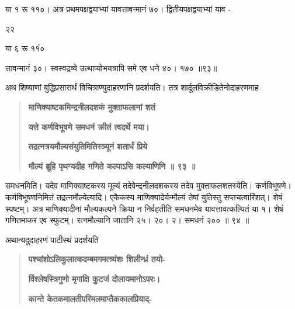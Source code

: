 \documentclass[11pt, openany]{book}
\begin{document}
\begin{sloppypar}
\hangindent=0.2in या १ रू ११०। अत्र प्रथमपक्षद्वयाभ्यां यावत्तावन्मानं ७०। द्वितीयपक्षद्वयाभ्यां याव -

\hspace{0.2in}२\hspace{0.3in}२

या ६ रू ११ं०

\hangindent=0.2in त्तावन्मानं ३०। स्वस्वद्रव्ये उत्थाप्योभयत्रापि समे एव धने ४०। १७० ॥९३॥

\hangindent=0.2in \hspace{0.2in}अथ शिष्याणां बुद्धिप्रसारार्थं विचित्राण्युदाहरणानि प्रदर्शयति। तत्र शार्दूलविक्रीडितेनोदाहरणमाह\textendash

\begin{quote}
\hspace{1in}\textbf{माणिक्याष्टकमिन्द्रनीलदशकं मुक्ताफलानां शतं}

\hspace{1in}\textbf{यत्ते कर्णविभूषणे समधनं क्रीतं त्वदर्थे मया।}

\hspace{1in}\textbf{तद्रत्नत्रयमौल्यसंयुतिमितिस्ञ्यूनं शतार्धं प्रिये}

\hspace{1in}\textbf{मौल्यं ब्रूहि पृथग्यदीह गणिते कल्पाऽसि कल्याणिनि ॥ ९३ ॥}
\end{quote}

\hangindent=0.2in \hspace{0.2in}समधनमिति। यदेव माणिक्याष्टकस्य मूल्यं तदेवेन्द्रनीलदशकस्य तदेव मुक्ताफलशतस्येति। कर्णविभूषणे। कर्णविभूषणनिमित्तं तद्रत्नमौल्येत्यादि। एकैकस्य माणिक्यादेर्यन्मौल्यं तेषां युतिस्तु सप्तचत्वारिंशत्। शेषं स्पष्टम्। अत्र माणिक्यादीनां मौल्यकल्पने क्रिया न निर्वहतीति समधनमेव यावत्तावत्कल्पितं या १। शेषं गणितमाकर एव स्फुटम्। रत्नमौल्यानि जातानि २५। २०। २। समधनं २०० ॥ ९४ ॥

\hangindent=0.2in \hspace{0.2in}अथान्यदुदाहरणं पाटीस्थं प्रदर्शयति\textendash

\begin{quote}
\hspace{1in}\textbf{पश्चांशोऽलिकुलात्कदम्बमगमत्त्र्यंशः शिलीन्ध्रं तयो-}

\hspace{1in}\textbf{र्विश्लेषस्त्रिगुणो मृगाक्षि कुटजं दोलायमानोऽपरः।}

\hspace{1in}\textbf{कान्ते केतकमालतीपरिमलमाप्तैककालप्रियाद्-}


\end{quote}
\end{sloppypar}
\end{document}
